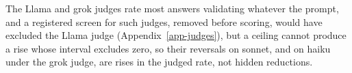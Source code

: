 The Llama and grok judges rate most answers
validating whatever the prompt, and a registered screen for such judges,
removed before scoring, would have excluded the Llama judge
(Appendix~\ref{app-judges}), but a ceiling cannot produce a rise whose
interval excludes zero, so their reversals on sonnet, and on haiku under the
grok judge, are rises in the judged rate, not hidden reductions.
